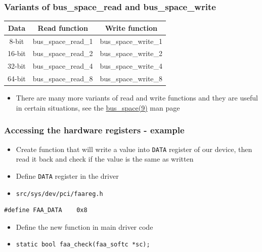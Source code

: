 \documentclass[dvipsnames,table]{beamer}
\begin{document}
\begin{frame}
\frametitle{Variants of bus\_space\_read and bus\_space\_write}
\begin{center}
\begin{tabular}{|c|c|c|}
\hline
Data & Read function & Write function \\
\hline
\hline
8-bit & bus\_space\_read\_1 & bus\_space\_write\_1 \\
\hline
16-bit & bus\_space\_read\_2 & bus\_space\_write\_2 \\
\hline
32-bit & bus\_space\_read\_4 & bus\_space\_write\_4 \\
\hline
64-bit & bus\_space\_read\_8 & bus\_space\_write\_8 \\
\hline
\end{tabular}
\end{center}
\begin{itemize}
	\item There are many more variants of read and write functions and they are useful in certain situations, see the \href{http://netbsd.gw.com/cgi-bin/man-cgi?bus_space++NetBSD-current}{bus\_space(9)} man page
\end{itemize}
\end{frame}

\begin{frame}[fragile]
\frametitle{Accessing the hardware registers - example}
\begin{itemize}
	\item Create function that will write a value into {\tt DATA} register of our device, then read it back and check if the value is the same as written
	\item Define {\tt DATA} register in the driver
	\item {\tt src/sys/dev/pci/faareg.h}
\end{itemize}
\begin{lstlisting}
#define FAA_DATA	0x8
\end{lstlisting}
\begin{itemize}
	\item Define the new function in main driver code
	\item {\tt static bool faa\_check(faa\_softc *sc);}
\end{itemize}
\end{frame}
\end{document}
